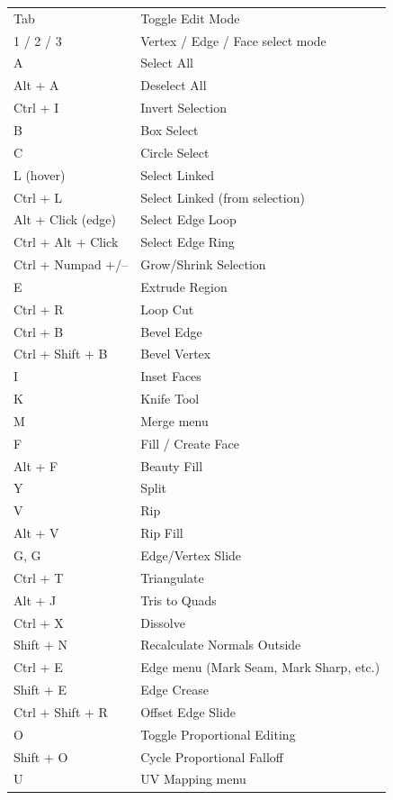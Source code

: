 \begin{shortcutbox}
\begin{center}
\begin{tabularx}{\textwidth}{C{3.5cm}X}
\toprule
{}
 &  \\
\midrule
Tab & Toggle Edit Mode \\
1 / 2 / 3 & Vertex / Edge / Face select mode \\
A & Select All \\
Alt + A & Deselect All \\
Ctrl + I & Invert Selection \\
B & Box Select \\
C & Circle Select \\
L (hover) & Select Linked \\
Ctrl + L & Select Linked (from selection) \\
Alt + Click (edge) & Select Edge Loop \\
Ctrl + Alt + Click & Select Edge Ring \\
Ctrl + Numpad +/-- & Grow/Shrink Selection \\
\midrule
E & Extrude Region \\
Ctrl + R & Loop Cut \\
Ctrl + B & Bevel Edge \\
Ctrl + Shift + B & Bevel Vertex \\
I & Inset Faces \\
K & Knife Tool \\
M & Merge menu \\
F & Fill / Create Face \\
Alt + F & Beauty Fill \\
Y & Split \\
V & Rip \\
Alt + V & Rip Fill \\
\midrule
G, G & Edge/Vertex Slide \\
Ctrl + T & Triangulate \\
Alt + J & Tris to Quads \\
Ctrl + X & Dissolve \\
Shift + N & Recalculate Normals Outside \\
Ctrl + E & Edge menu (Mark Seam, Mark Sharp, etc.) \\
Shift + E & Edge Crease \\
Ctrl + Shift + R & Offset Edge Slide \\
\midrule
O & Toggle Proportional Editing \\
Shift + O & Cycle Proportional Falloff \\
U & UV Mapping menu \\
\bottomrule
\end{tabularx}
\end{center}
\end{shortcutbox}

